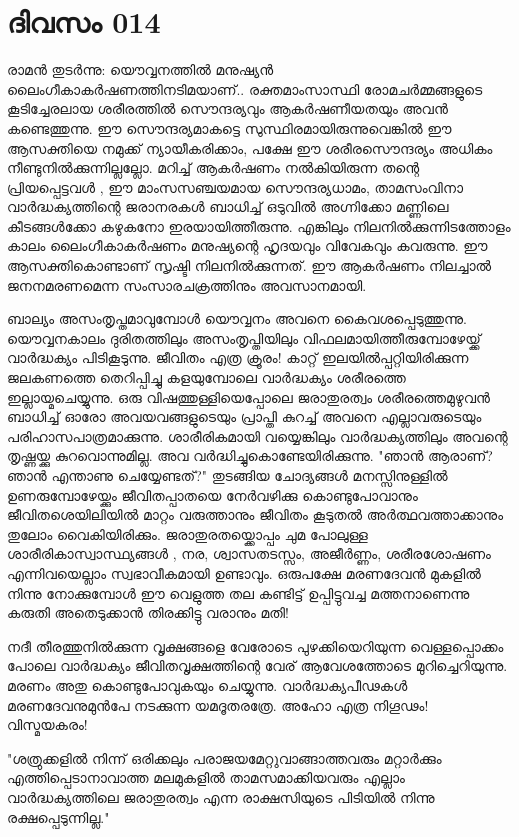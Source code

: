  
\section{ദിവസം 014}


രാമന്‍ തുടര്‍ന്നു: യൌവ്വനത്തില്‍ മനുഷ്യന്‍ ലൈംഗീകാകര്‍ഷണത്തിനടിമയാണ്‌..  രക്തമാംസാസ്ഥി രോമചര്‍മ്മങ്ങളുടെ കൂടിച്ചേരലായ ശരീരത്തില്‍ സൌന്ദര്യവും ആകര്‍ഷണീയതയും അവന്‍ കണ്ടെത്തുന്നു. ഈ സൌന്ദര്യമാകട്ടെ സുസ്ഥിരമായിരുന്നുവെങ്കില്‍ ഈ ആസക്തിയെ നമുക്ക്‌ ന്യായീകരിക്കാം, പക്ഷേ ഈ ശരീരസൌന്ദര്യം അധികം നീണ്ടുനില്‍ക്കുന്നില്ലല്ലോ. മറിച്ച്‌ ആകര്‍ഷണം നല്‍കിയിരുന്ന തന്റെ പ്രിയപ്പെട്ടവള്‍ , ഈ മാംസസഞ്ചയമായ സൌന്ദര്യധാമം, താമസംവിനാ വാര്‍ദ്ധക്യത്തിന്റെ ജരാനരകള്‍ ബാധിച്ച്‌ ഒടുവില്‍ അഗ്നിക്കോ മണ്ണിലെ കീടങ്ങള്‍ക്കോ കഴുകനോ ഇരയായിത്തീരുന്നു. എങ്കിലും നിലനില്‍ക്കുന്നിടത്തോളം കാലം ലൈംഗീകാകര്‍ഷണം മനുഷ്യന്റെ ഹൃദയവും വിവേകവും കവരുന്നു. ഈ ആസക്തികൊണ്ടാണ്‌ സൃഷ്ടി നിലനില്‍ക്കുന്നത്‌. ഈ ആകര്‍ഷണം നിലച്ചാല്‍ ജനനമരണമെന്ന സംസാരചക്രത്തിനും അവസാനമായി.

ബാല്യം അസംതൃപ്തമാവുമ്പോള്‍ യൌവ്വനം അവനെ കൈവശപ്പെടുത്തുന്നു. യൌവ്വനകാലം ദുരിതത്തിലും അസംതൃപ്തിയിലും വിഫലമായിത്തീരുമ്പോഴേയ്ക്ക്‌ വാര്‍ദ്ധക്യം പിടികൂടുന്നു. ജീവിതം എത്ര ക്രൂരം! കാറ്റ്‌ ഇലയില്‍പ്പറ്റിയിരിക്കുന്ന ജലകണത്തെ തെറിപ്പിച്ചു കളയുമ്പോലെ വാര്‍ദ്ധക്യം ശരീരത്തെ ഇല്ലായ്മചെയ്യുന്നു. ഒരു വിഷത്തുള്ളിയെപ്പോലെ ജരാതുരത്വം ശരീരത്തെമുഴുവന്‍ ബാധിച്ച്‌ ഓരോ അവയവങ്ങളുടെയും പ്രാപ്തി കുറച്ച്‌ അവനെ എല്ലാവരുടെയും പരിഹാസപാത്രമാക്കുന്നു. ശാരീരികമായി വയ്യെങ്കിലും വാര്‍ദ്ധക്യത്തിലും അവന്റെ തൃഷ്ണയ്ക്കു കുറവൊന്നുമില്ല. അവ വര്‍ദ്ധിച്ചുകൊണ്ടേയിരിക്കുന്നു. "ഞാന്‍ ആരാണ്‌? ഞാന്‍ എന്താണു ചെയ്യേണ്ടത്‌?" തുടങ്ങിയ ചോദ്യങ്ങള്‍ മനസ്സിനുള്ളില്‍ ഉണരുമ്പോഴേയ്ക്കും ജീവിതപ്പാതയെ നേര്‍വഴിക്കു കൊണ്ടുപോവാനും ജീവിതശെയിലിയില്‍ മാറ്റം വരുത്താനും ജീവിതം കൂടുതല്‍ അര്‍ത്ഥവത്താക്കാനും തുലോം വൈകിയിരിക്കും. ജരാതുരതയ്ക്കൊപ്പം ചുമ പോലുള്ള ശാരീരികാസ്വാസ്ഥ്യങ്ങള്‍ , നര, ശ്വാസതടസ്സം, അജീര്‍ണ്ണം, ശരീരശോഷണം എന്നിവയെല്ലാം സ്വഭാവീകമായി ഉണ്ടാവും. ഒരുപക്ഷേ മരണദേവന്‍ മുകളില്‍ നിന്നു നോക്കുമ്പോള്‍ ഈ വെളുത്ത തല കണ്ടിട്ട്‌ ഉപ്പിട്ടുവച്ച മത്തനാണെന്നു കരുതി അതെടുക്കാന്‍ തിരക്കിട്ടു വരാനും മതി!

നദീ തീരത്തുനില്‍ക്കുന്ന വൃക്ഷങ്ങളെ വേരോടെ പുഴക്കിയെറിയുന്ന വെള്ളപ്പൊക്കം പോലെ വാര്‍ദ്ധക്യം ജീവിതവൃക്ഷത്തിന്റെ വേര്‌ ആവേശത്തോടെ മുറിച്ചെറിയുന്നു. മരണം അതു കൊണ്ടുപോവുകയും ചെയ്യുന്നു. വാര്‍ദ്ധക്യപീഢകള്‍ മരണദേവനുമുന്‍പേ നടക്കുന്ന യമദൂതരത്രേ. അഹോ എത്ര നിഗൂഢം! വിസ്മയകരം!

"ശത്രുക്കളില്‍ നിന്ന് ഒരിക്കലും പരാജയമേറ്റുവാങ്ങാത്തവരും മറ്റാര്‍ക്കും എത്തിപ്പെടാനാവാത്ത മലമുകളില്‍ താമസമാക്കിയവരും എല്ലാം വാര്‍ദ്ധക്യത്തിലെ ജരാതുരത്വം എന്ന രാക്ഷസിയുടെ പിടിയില്‍ നിന്നു രക്ഷപ്പെടുന്നില്ല."
